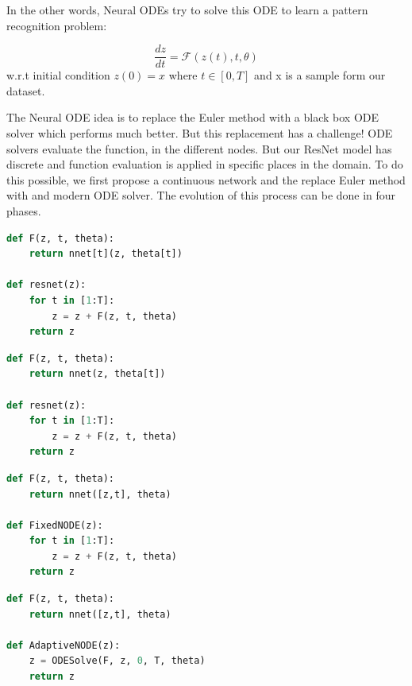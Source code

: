 \documentclass{article}
\begin{document}
	In the other words, Neural ODEs try to solve this ODE to learn a pattern recognition problem:
	
	\begin{equation*}
	\frac{{dz}}{{dt}} = \mathcal{F}\left( {z(t),t,\theta} \right)
	\end{equation*}
	w.r.t initial condition $z(0) = x$ where $t \in [0, T]$ and x is a sample form our dataset.
	
	The Neural ODE idea is to replace the Euler method with a black box ODE solver which performs much better. But this replacement has a challenge! ODE solvers evaluate the function, in the different nodes. But our ResNet model has discrete and function evaluation is applied in specific places in the domain. To do this possible, we first propose a continuous network and the replace Euler method with and modern ODE solver. The evolution of this process can be done in four phases.
	
\begin{minipage}{.46\textwidth}
\begin{lstlisting}[language=Python, caption=Different Res Blocks for each time step,label=code1]
def F(z, t, theta):
    return nnet[t](z, theta[t])

def resnet(z):
    for t in [1:T]:
        z = z + F(z, t, theta)
    return z
\end{lstlisting}
\end{minipage}\hfill
\begin{minipage}{.46\textwidth}
\begin{lstlisting}[language=Python, caption=Different weights for similar Res Blocks,label=code2]
def F(z, t, theta):
    return nnet(z, theta[t])

def resnet(z):
    for t in [1:T]:
        z = z + F(z, t, theta)
    return z
\end{lstlisting}
\end{minipage}\hfill

\begin{minipage}{.46\textwidth}
\begin{lstlisting}[language=Python, caption=Shared weights\, continuous model,label=code3]
def F(z, t, theta):
    return nnet([z,t], theta)

def FixedNODE(z):
    for t in [1:T]:
        z = z + F(z, t, theta)
    return z
\end{lstlisting}
\end{minipage}\hfill
\begin{minipage}{.46\textwidth}
\begin{lstlisting}[language=Python,caption=Replace Euler with adaptive solver,label=code4]
def F(z, t, theta):
    return nnet([z,t], theta)

def AdaptiveNODE(z):
    z = ODESolve(F, z, 0, T, theta)
    return z
\end{lstlisting}
\end{minipage}\hfill
	\\
	
\end{document}
